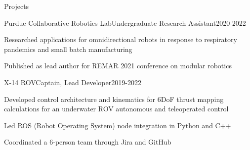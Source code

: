 \documentclass[]{jheidegger-resume}
\begin{document}
\begin{section}{Projects}
\begin{subsection_small}{Purdue Collaborative Robotics Lab}{Undergraduate Research Assistant}{2020-2022}
    \item{Researched applications for omnidirectional robots in response to respiratory pandemics and small batch manufacturing}
    \item {Published as lead author for REMAR 2021 conference on modular robotics}
\end{subsection_small}
\begin{subsection_small}{X-14 ROV}{Captain, Lead Developer}{2019-2022}
    \item{Developed control architecture and kinematics for 6DoF thrust mapping calculations for an underwater ROV autonomous and teleoperated control}
    \item {Led ROS (Robot Operating System) node integration in Python and C++}
    \item{Coordinated a 6-person team through Jira and GitHub}
\end{subsection_small}

\end{section}
 {
}




\end{document}
